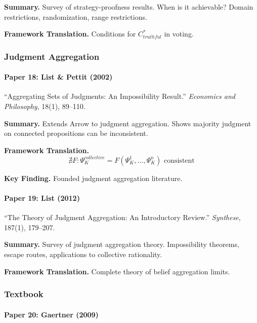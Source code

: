\textbf{Summary.}
Survey of strategy-proofness results. When is it achievable? 
Domain restrictions, randomization, range restrictions.

\textbf{Framework Translation.}
Conditions for $C^*_{truthful}$ in voting.

\subsubsection{Judgment Aggregation}

\paragraph{Paper 18: List \& Pettit (2002)}

``Aggregating Sets of Judgments: An Impossibility Result.''
\textit{Economics and Philosophy}, 18(1), 89--110.

\textbf{Summary.}
Extends Arrow to judgment aggregation. Shows majority judgment 
on connected propositions can be inconsistent.

\textbf{Framework Translation.}
\begin{equation}
\nexists F: \Psi_K^{collective} = F(\Psi_K^1, \ldots, \Psi_K^n) \text{ consistent}
\end{equation}

\textbf{Key Finding.}
Founded judgment aggregation literature.

\paragraph{Paper 19: List (2012)}

``The Theory of Judgment Aggregation: An Introductory Review.''
\textit{Synthese}, 187(1), 179--207.

\textbf{Summary.}
Survey of judgment aggregation theory. Impossibility theorems, 
escape routes, applications to collective rationality.

\textbf{Framework Translation.}
Complete theory of belief aggregation limits.

\subsubsection{Textbook}

\paragraph{Paper 20: Gaertner (2009)}

